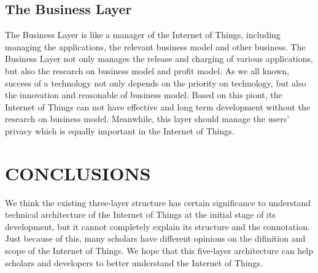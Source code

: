 \documentclass{article}
\begin{document}
\subsection{The Business Layer}

The Business Layer is like a manager of the Internet of Things, including managing the applications, the relevant business model and other business. The Business Layer not only manages the release and charging of various applications, but also the research on business model and profit model. As we all known, success of a technology not only depends on the priority on technology, but also the innovation and reasonable of business model. Based on this piont, the Internet of Things can not have effective and long­ term development without the research on business model. Meanwhile, this layer should manage the users' privacy which is equally important in the Internet of Things.

\section{CONCLUSIONS}

We think the existing three-layer structure has certain significance to understand technical architecture of the Internet of Things at the initial stage of its development, but it cannot completely explain its structure and the connotation. Just because of this, many scholars have different opinions on the difinition and scope of the Internet of Things. We hope that this five-layer architecture can help scholars and developers to better understand the Internet of Things.
\end{document}
